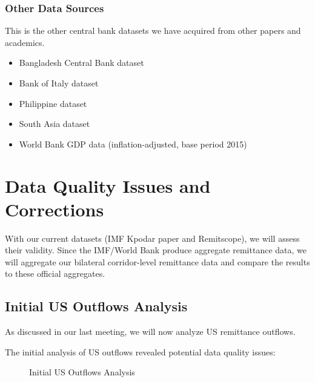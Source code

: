 \documentclass[
  11pt,
]{article}
\providecommand{\tightlist}{%
  \setlength{\itemsep}{0pt}\setlength{\parskip}{0pt}}\usepackage{longtable,booktabs,array}
\begin{document}
\subsubsection{Other Data Sources}\label{other-data-sources}

This is the other central bank datasets we have acquired from other
papers and academics.

\begin{itemize}
\tightlist
\item
  Bangladesh Central Bank dataset
\item
  Bank of Italy dataset
\item
  Philippine dataset
\item
  South Asia dataset
\item
  World Bank GDP data (inflation-adjusted, base period 2015)
\end{itemize}

\section{Data Quality Issues and
Corrections}\label{data-quality-issues-and-corrections}

With our current datasets (IMF Kpodar paper and Remitscope), we will
assess their validity. Since the IMF/World Bank produce aggregate
remittance data, we will aggregate our bilateral corridor-level
remittance data and compare the results to these official aggregates.

\subsection{Initial US Outflows
Analysis}\label{initial-us-outflows-analysis}

As discussed in our last meeting, we will now analyze US remittance
outflows.

The initial analysis of US outflows revealed potential data quality
issues:

\begin{figure}[H]


\caption{\label{fig-us-outflows-initial}Initial US Outflows Analysis}

\end{figure}%
\end{document}
